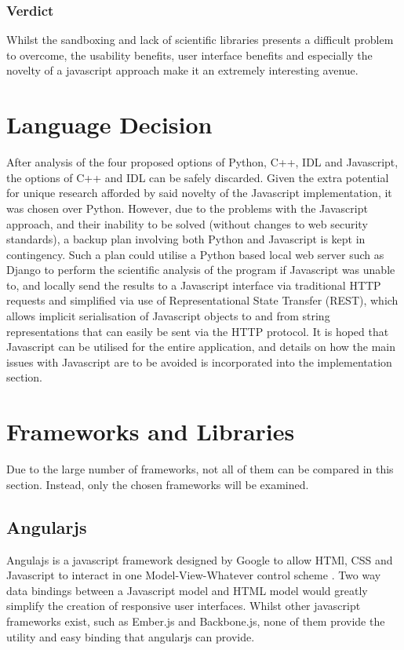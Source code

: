 \documentclass[titlesmallcaps, examinerscopy, copyrightpage]{uqthesis}
\begin{document}
\subsubsection{Verdict}

Whilst the sandboxing and lack of scientific libraries presents a difficult problem to overcome, the usability benefits, user interface benefits and especially the novelty of a javascript approach make it an extremely interesting avenue.


\section{Language Decision}

After analysis of the four proposed options of Python, C++, IDL and Javascript, the options of C++ and IDL can be safely discarded. Given the extra potential for unique research afforded by said novelty of the Javascript implementation, it was chosen over Python. However, due to the problems with the Javascript approach, and their inability to be solved (without changes to web security standards), a backup plan involving both Python and Javascript is kept in contingency. Such a plan could utilise a Python based local web server such as Django to perform the scientific analysis of the program if Javascript was unable to, and locally send the results to a Javascript interface via traditional HTTP requests and simplified via use of Representational State Transfer (REST), which allows implicit serialisation of Javascript objects to and from string representations that can easily be sent via the HTTP protocol. It is hoped that Javascript can be utilised for the entire application, and details on how the main issues with Javascript are to be avoided is incorporated into the implementation section.


\section{Frameworks and Libraries}

Due to the large number of frameworks, not all of them can be compared in this section. Instead, only the chosen frameworks will be examined.

\subsection{Angularjs}

Angulajs is a javascript framework designed by Google to allow HTMl, CSS and Javascript to interact in one Model-View-Whatever control scheme \cite{angularjs}. Two way data bindings between a Javascript model and HTML model would greatly simplify the creation of responsive user interfaces. Whilst other javascript frameworks exist, such as Ember.js and Backbone.js, none of them provide the utility and easy binding that angularjs can provide.
\end{document}
